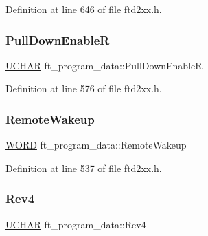 Definition at line 646 of file ftd2xx.\+h.

\mbox{\label{structft__program__data_a78a9293c320445bb93f54b166b81305c}} 
\subsubsection{\texorpdfstring{Pull\+Down\+EnableR}{PullDownEnableR}}
{\footnotesize\ttfamily \hyperlink{CatCaloProto40MHz_2inc_2WinTypes_8h_a4f4bb67531a9bf6f0b9c6ad76aeba587}{U\+C\+H\+AR} ft\+\_\+program\+\_\+data\+::\+Pull\+Down\+EnableR}



Definition at line 576 of file ftd2xx.\+h.

\mbox{\label{structft__program__data_ace6f9b75bffa94d7926296734f5b227f}} 
\subsubsection{\texorpdfstring{Remote\+Wakeup}{RemoteWakeup}}
{\footnotesize\ttfamily \hyperlink{CatCaloProto40MHz_2inc_2WinTypes_8h_a197942eefa7db30960ae396d68339b97}{W\+O\+RD} ft\+\_\+program\+\_\+data\+::\+Remote\+Wakeup}



Definition at line 537 of file ftd2xx.\+h.

\mbox{\label{structft__program__data_aa0dc9b6f09c70bde10b560e3e122e79d}} 
\subsubsection{\texorpdfstring{Rev4}{Rev4}}
{\footnotesize\ttfamily \hyperlink{CatCaloProto40MHz_2inc_2WinTypes_8h_a4f4bb67531a9bf6f0b9c6ad76aeba587}{U\+C\+H\+AR} ft\+\_\+program\+\_\+data\+::\+Rev4}




